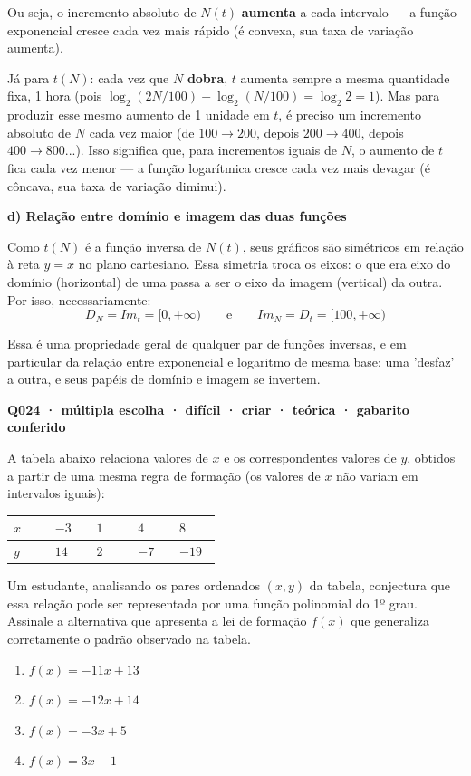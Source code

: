 Ou seja, o incremento absoluto de $N(t)$ \textbf{aumenta} a cada intervalo — a função exponencial cresce cada vez mais rápido (é convexa, sua taxa de variação aumenta).

Já para $t(N)$: cada vez que $N$ \textbf{dobra}, $t$ aumenta sempre a mesma quantidade fixa, 1 hora (pois $\log_2(2N/100) - \log_2(N/100) = \log_2 2 = 1$). Mas para produzir esse mesmo aumento de 1 unidade em $t$, é preciso um incremento absoluto de $N$ cada vez maior (de $100\to200$, depois $200\to400$, depois $400\to800$...). Isso significa que, para incrementos iguais de $N$, o aumento de $t$ fica cada vez menor — a função logarítmica cresce cada vez mais devagar (é côncava, sua taxa de variação diminui).

\textbf{d) Relação entre domínio e imagem das duas funções}

Como $t(N)$ é a função inversa de $N(t)$, seus gráficos são simétricos em relação à reta $y=x$ no plano cartesiano. Essa simetria troca os eixos: o que era eixo do domínio (horizontal) de uma passa a ser o eixo da imagem (vertical) da outra. Por isso, necessariamente:
$$D_{N} = Im_{t} = [0,+\infty) \qquad \text{e} \qquad Im_{N} = D_{t} = [100,+\infty)$$

Essa é uma propriedade geral de qualquer par de funções inversas, e em particular da relação entre exponencial e logaritmo de mesma base: uma 'desfaz' a outra, e seus papéis de domínio e imagem se invertem.

\bigskip\noindent\textbf{Q024 · múltipla escolha · difícil · criar · teórica · gabarito conferido}\par\nopagebreak
A tabela abaixo relaciona valores de $x$ e os correspondentes valores de $y$, obtidos a partir de uma mesma regra de formação (os valores de $x$ não variam em intervalos iguais):

\begin{center}
\begin{tabular}{|p{0.172\linewidth}|p{0.172\linewidth}|p{0.172\linewidth}|p{0.172\linewidth}|p{0.172\linewidth}|}
\hline
\textbf{$x$} & \textbf{$-3$} & \textbf{$1$} & \textbf{$4$} & \textbf{$8$} \\
\hline
$y$ & $14$ & $2$ & $-7$ & $-19$ \\
\hline
\end{tabular}
\end{center}

Um estudante, analisando os pares ordenados $(x,y)$ da tabela, conjectura que essa relação pode ser representada por uma função polinomial do 1º grau. Assinale a alternativa que apresenta a lei de formação $f(x)$ que generaliza corretamente o padrão observado na tabela.
\begin{enumerate}[label=(\alph*)]
\item $f(x) = -11x + 13$
\item $f(x) = -12x + 14$
\item $f(x) = -3x + 5$
\item $f(x) = 3x - 1$
\end{enumerate}

